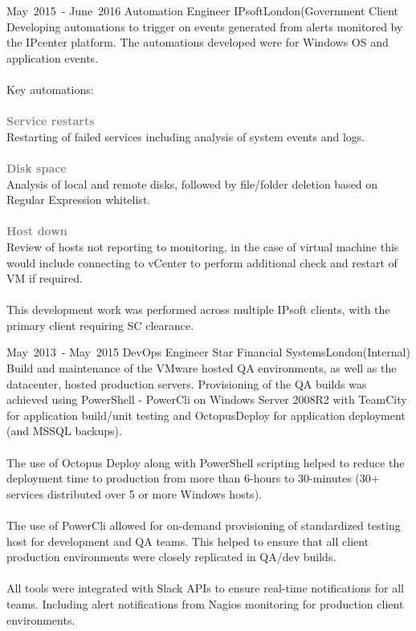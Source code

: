 \cventry %
  {\mbox{May 2015 -} \mbox{June 2016}}
  {Automation Engineer}
  {IPsoft}{London}{(Government Client}
  {
    Developing automations to trigger on events generated from alerts monitored 
    by the IPcenter platform. 
    The automations developed were for Windows OS and application events.\\~\\
    Key automations:\\\\
    \textcolor{gray}{\textbf{Service restarts}}\\
    Restarting of failed services including analysis of system events and logs.\\\\
    \textcolor{gray}{\textbf{Disk space}}\\
    Analysis of local and remote disks, followed by file/folder deletion based on Regular 
    Expression whitelist.\\\\
    \textcolor{gray}{\textbf{Host down}}\\
    Review of hosts not reporting to monitoring, in the case of virtual machine this 
    would include connecting to vCenter to perform additional check and restart 
    of VM if required.\\\\
    This development work was performed across multiple IPsoft clients, 
    with the primary client requiring SC clearance.\\ 
  }

\cventry %
  {\mbox{May 2013 -} \mbox{May 2015}}
  {DevOps Engineer}
  {Star Financial Systems}{London}{(Internal)}
  {
    Build and maintenance of the VMware hosted QA environments, as well as the datacenter, 
    hosted production servers. Provisioning of the QA builds was achieved using PowerShell - PowerCli 
    on Windows Server 2008R2 with TeamCity for application build/unit testing and OctopusDeploy 
    for application deployment (and MSSQL backups).\\~\\
    The use of Octopus Deploy along with PowerShell scripting helped to reduce the deployment time 
    to production from more than 6-hours to 30-minutes (30+ services distributed over 5 or more Windows hosts).\\~\\
    The use of PowerCli allowed for on-demand provisioning of standardized testing host for development and QA teams. 
    This helped to ensure that all client production environments were closely replicated in QA/dev builds.\\~\\
    All tools were integrated with Slack APIs to ensure real-time notifications for all teams.
    Including alert notifications from Nagios monitoring for production client environments.\\
  }

